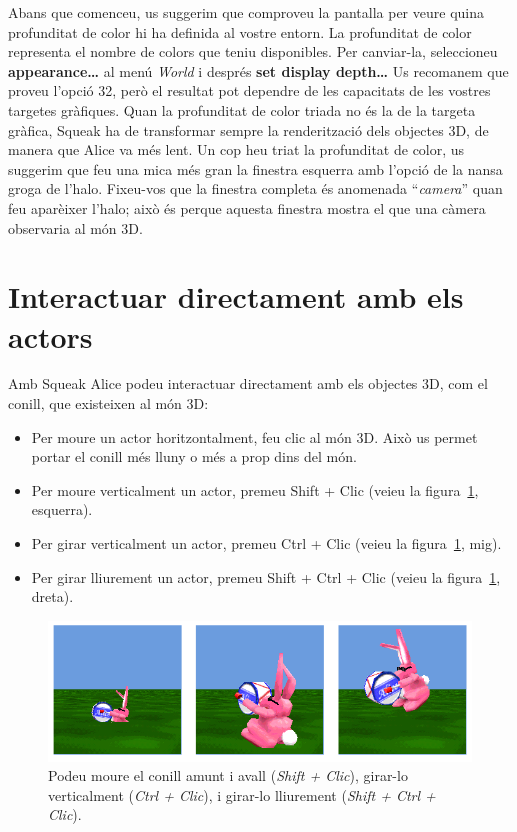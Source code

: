 Abans que comenceu, us suggerim que comproveu la pantalla per veure quina profunditat de color hi ha definida al vostre entorn. La profunditat de color representa el nombre de colors que teniu disponibles. Per canviar-la, seleccioneu \textbf{appearance\dots} al menú \emph{World} i després \textbf{set display depth\dots} Us recomanem que proveu l'opció 32, però el resultat pot dependre de les capacitats de les vostres targetes gràfiques. Quan la profunditat de color triada no és la de la targeta gràfica, Squeak ha de transformar sempre la renderització dels objectes 3D, de manera que Alice va més lent. Un cop heu triat la profunditat de color, us suggerim que feu una mica més gran la finestra esquerra amb l'opció de la nansa groga de l'halo. Fixeu-vos que la finestra completa és anomenada ``\emph{camera}'' quan feu aparèixer l'halo; això és perque aquesta finestra mostra el que una càmera observaria al món 3D.

\section{Interactuar directament amb els actors}
Amb Squeak Alice podeu interactuar directament amb els objectes 3D, com el conill, que existeixen al món 3D:
\begin{itemize}
\item Per moure un actor horitzontalment, feu clic al món 3D. Això us permet portar el conill més lluny o més a prop dins del món.
\item Per moure verticalment un actor, premeu \textsf{Shift + Clic} (veieu la figura~\ref{fig2503}, esquerra).
\item Per girar verticalment un actor, premeu \textsf{Ctrl + Clic} (veieu la figura~\ref{fig2503}, mig).
\item Per girar lliurement un actor, premeu \textsf{Shift + Ctrl + Clic} (veieu la figura~\ref{fig2503}, dreta).
\end{itemize}
\begin{figure}[h!]
\begin{center}
\includegraphics[scale=2]{Imatges/figura25-3}
\end{center}
\caption{Podeu moure el conill amunt i avall (\emph{Shift + Clic}), girar-lo verticalment (\emph{Ctrl + Clic}), i girar-lo lliurement (\emph{Shift + Ctrl + Clic}).}
\label{fig2503}
\end{figure}

